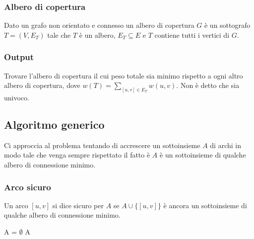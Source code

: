 \subsubsection{Albero di copertura}
Dato un grafo non orientato e connesso un albero di copertura $G$ \`e un sottografo $T=(V, E_T)$ tale che $T$ \`e un albero, $E_T\subseteq E$ e $T$ contiene tutti i vertici di $G$. 
\subsubsection{Output}
Trovare l'albero di copertura il cui peso totale sia minimo rispetto a ogni altro albero di copertura, dove $w(T)=\sum\limits_{[u, v]\in E_T} w(u, v)$. Non \`e detto che sia univoco.
\subsection{Algoritmo generico}
Ci approccia al problema tentando di accrescere un sottoinsieme $A$ di archi in modo tale che venga sempre rispettato il fatto \`e $A$ \`e un sottoinsieme di qualche albero di 
connessione minimo.
\subsubsection{Arco sicuro}
Un arco $[u, v]$ si dice sicuro per $A$ se $A\cup\{[u, v]\}$ \`e ancora un sottoinsieme di qualche albero di connessione minimo.\\
\begin{algorithm}[H]
\DontPrintSemicolon
{}






\SetKwFunction{}{}
\SetKwFunction{}{}
\SetKwFunction{}{}
\SetKwFunction{}{}
\SetKwFunction{}{}

\caption{\protect\Set \protect{}}
\Set A = $\emptyset$\;
\Return A\;
\end{algorithm}

